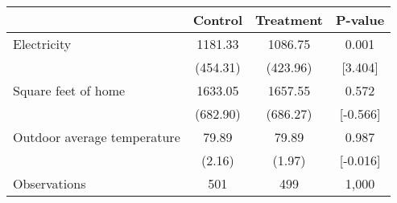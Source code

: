 {
\def\sym#1{\ifmmode^{#1}\else\(^{#1}\)\fi}
\begin{tabular}{l*{3}{c}}
\hline\hline
                    &\multicolumn{1}{c}{Control}&\multicolumn{1}{c}{Treatment}&\multicolumn{1}{c}{P-value}\\
\hline
Electricity         &    1181.33 &    1086.75 &       0.001\\
                    &   (454.31) &   (423.96) &     [3.404]\\
Square feet of home &    1633.05 &    1657.55 &       0.572\\
                    &   (682.90) &   (686.27) &    [-0.566]\\
Outdoor average temperature&      79.89 &      79.89 &       0.987\\
                    &     (2.16) &     (1.97) &    [-0.016]\\
\hline
Observations        &         501&         499&       1,000\\
\hline\hline
\end{tabular}
}
